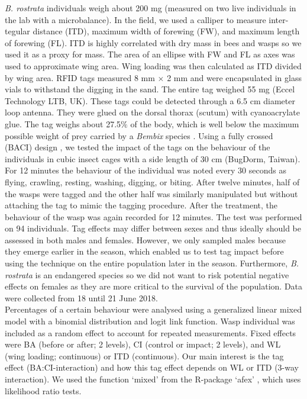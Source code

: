 \documentclass[10pt, twoside]{book} %
\begin{document}
\begin{tcolorbox}[box, breakable, boxrule=1pt,toprule at break=1pt,extras={toprule at break=1pt}]
		\textit{B. rostrata} individuals weigh about 200 mg (measured on two live individuals in the lab with a microbalance). In the field, we used a calliper to measure inter-tegular distance (ITD), maximum width of forewing (FW), and maximum length of forewing (FL). ITD is highly correlated with dry mass in bees and wasps \citep{cane1987, ohl2007} so we used it as a proxy for mass. The area of an ellipse with FW and FL as axes was used to approximate wing area. Wing loading was then calculated as ITD divided by wing area. RFID tags measured 8 mm $\times$ 2 mm and were encapsulated in glass vials to withstand the digging in the sand. The entire tag weighed 55 mg (Eccel Technology LTB, UK). These tags could be detected through a 6.5 cm diameter loop antenna. They were glued on the dorsal thorax (scutum) with cyanoacrylate glue. The tag weighs about 27.5$\%$ of the body, which is well below the maximum possible weight of prey carried by a \textit{Bembix} species \citep{asis2011}. Using a fully crossed (BACI) design \citep{smith2002}, we tested the impact of the tags on the behaviour of the individuals in cubic insect cages with a side length of 30 cm (BugDorm, Taiwan). For 12 minutes the behaviour of the individual was noted every 30 seconds as flying, crawling, resting, washing, digging, or biting. After twelve minutes, half of the wasps were tagged and the other half was similarly manipulated but without attaching the tag to mimic the tagging procedure. After the treatment, the behaviour of the wasp was again recorded for 12 minutes. The test was performed on 94 individuals. Tag effects may differ between sexes and thus ideally should be assessed in both males and females. However, we only sampled males because they emerge earlier in the season, which enabled us to test tag impact before using the technique on the entire population later in the season. Furthermore, \textit{B. rostrata} is an endangered species so we did not want to risk potential negative effects on females as they are more critical to the survival of the population. Data were collected from 18 until 21 June 2018.\\
		
		Percentages of a certain behaviour were analysed using a generalized linear mixed model with a binomial distribution and logit link function. Wasp individual was included as a random effect to account for repeated measurements. Fixed effects were BA (before or after; 2 levels), CI (control or impact; 2 levels), and WL (wing loading; continuous) or ITD (continuous). Our main interest is the tag effect (BA:CI-interaction) and how this tag effect depends on WL or ITD (3-way interaction). We used the function `mixed' from the R-package `afex' \citep{singmann2019}, which uses likelihood ratio tests.\\
		

\end{tcolorbox}
\end{document}
